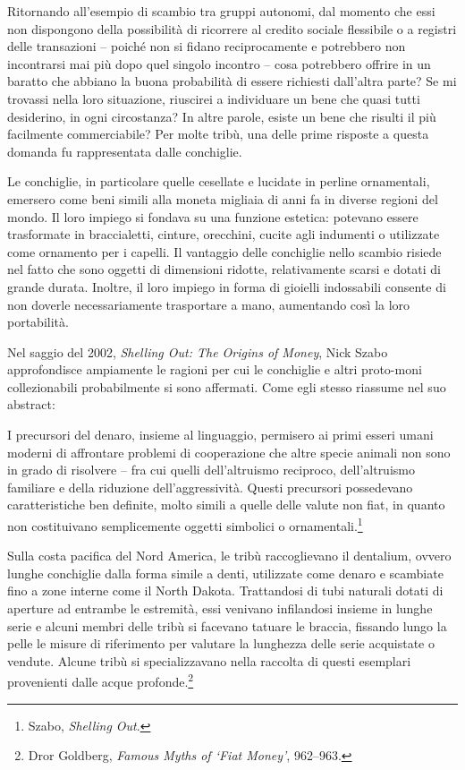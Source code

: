\documentclass[
  a5paper,
  smalldemyvopaper,10pt,twoside,onecolumn,openright,extrafontsizes,hidelinks]{memoir}
\begin{document}
Ritornando all'esempio di scambio tra gruppi autonomi, dal momento che
essi non dispongono della possibilità di ricorrere al credito sociale
flessibile o a registri delle transazioni -- poiché non si fidano
reciprocamente e potrebbero non incontrarsi mai più dopo quel singolo
incontro -- cosa potrebbero offrire in un baratto che abbiano la buona
probabilità di essere richiesti dall'altra parte? Se mi trovassi nella
loro situazione, riuscirei a individuare un bene che quasi tutti
desiderino, in ogni circostanza? In altre parole, esiste un bene che
risulti il più facilmente commerciabile? Per molte tribù, una delle
prime risposte a questa domanda fu rappresentata dalle conchiglie.

Le conchiglie, in particolare quelle cesellate e lucidate in perline
ornamentali, emersero come beni simili alla moneta migliaia di anni fa
in diverse regioni del mondo. Il loro impiego si fondava su una funzione
estetica: potevano essere trasformate in braccialetti, cinture,
orecchini, cucite agli indumenti o utilizzate come ornamento per i
capelli. Il vantaggio delle conchiglie nello scambio risiede nel fatto
che sono oggetti di dimensioni ridotte, relativamente scarsi e dotati di
grande durata. Inoltre, il loro impiego in forma di gioielli indossabili
consente di non doverle necessariamente trasportare a mano, aumentando
così la loro portabilità.

Nel saggio del 2002, \emph{Shelling Out: The Origins of Money}, Nick
Szabo approfondisce ampiamente le ragioni per cui le conchiglie e altri
proto-moni collezionabili probabilmente si sono affermati. Come egli
stesso riassume nel suo abstract:

I precursori del denaro, insieme al linguaggio, permisero ai primi
esseri umani moderni di affrontare problemi di cooperazione che altre
specie animali non sono in grado di risolvere -- fra cui quelli
dell'altruismo reciproco, dell'altruismo familiare e della riduzione
dell'aggressività. Questi precursori possedevano caratteristiche ben
definite, molto simili a quelle delle valute non fiat, in quanto non
costituivano semplicemente oggetti simbolici o ornamentali.\footnote{Szabo,
  \emph{Shelling Out}.}

Sulla costa pacifica del Nord America, le tribù raccoglievano il
dentalium, ovvero lunghe conchiglie dalla forma simile a denti,
utilizzate come denaro e scambiate fino a zone interne come il North
Dakota. Trattandosi di tubi naturali dotati di aperture ad entrambe le
estremità, essi venivano infilandosi insieme in lunghe serie e alcuni
membri delle tribù si facevano tatuare le braccia, fissando lungo la
pelle le misure di riferimento per valutare la lunghezza delle serie
acquistate o vendute. Alcune tribù si specializzavano nella raccolta di
questi esemplari provenienti dalle acque profonde.\footnote{Dror
  Goldberg, \emph{Famous Myths of `Fiat Money'}, 962--963.}
\end{document}
